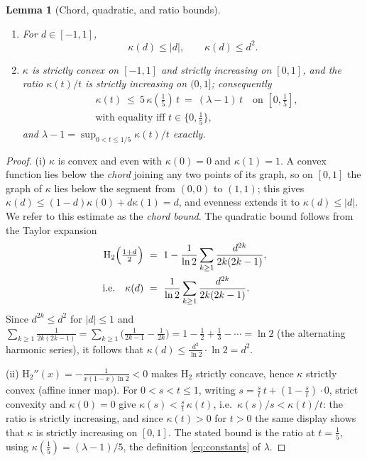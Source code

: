 \documentclass[journal]{IEEEtran}
\newtheorem{lemma}{Lemma}
\theoremstyle{definition}
\newcommand{\Hh}{\mathrm H_2}
\newcommand{\kp}{\kappa}
\newcommand{\lam}{\lambda}
\begin{document}
\begin{lemma}[Chord, quadratic, and ratio bounds]\label{lem:kappa}
\begin{enumerate}
\item[\textup{(i)}] For $d\in[-1,1]$,
\[
  \kp(d)\le|d|,\qquad \kp(d)\le d^2 .
\]
\item[\textup{(ii)}] $\kp$ is strictly convex on $[-1,1]$ and strictly
increasing on $[0,1]$, and the ratio $\kp(t)/t$ is strictly increasing on
$(0,1]$; consequently
\[
\begin{aligned}
  &\kp(t)\ \le\ 5\,\kp(\tfrac15)\,t\ =\ (\lam-1)\,t
  \quad\text{on }[0,\tfrac15],\\
  &\text{with equality iff }t\in\{0,\tfrac15\},
\end{aligned}
\]
and $\lam-1=\sup_{0<t\le1/5}\kp(t)/t$ exactly.
\end{enumerate}
\end{lemma}

\begin{proof}
(i) $\kp$ is convex and even with $\kp(0)=0$ and $\kp(1)=1$. A convex function
lies below the \emph{chord} joining any two points of its graph, so on $[0,1]$
the graph of $\kp$ lies below the segment from $(0,0)$ to $(1,1)$; this gives
$\kp(d)\le(1-d)\kp(0)+d\kp(1)=d$, and evenness extends it to $\kp(d)\le|d|$. We
refer to this estimate as the \emph{chord bound}. The
quadratic bound follows from the Taylor expansion
\[
\begin{aligned}
  \Hh\Bigl(\tfrac{1+d}{2}\Bigr)\ &=\ 1-\frac{1}{\ln2}\sum_{k\ge1}\frac{d^{2k}}{2k(2k-1)},\\
  \text{i.e.}\quad
  \kp(d)\ &=\ \frac{1}{\ln2}\sum_{k\ge1}\frac{d^{2k}}{2k(2k-1)}.
\end{aligned}
\]
Since $d^{2k}\le d^2$ for $|d|\le1$ and
$\sum_{k\ge1}\tfrac1{2k(2k-1)}=\sum_{k\ge1}\bigl(\tfrac1{2k-1}-\tfrac1{2k}\bigr)
=1-\tfrac12+\tfrac13-\cdots=\ln2$ (the alternating harmonic series), it follows
that $\kp(d)\le\tfrac{d^2}{\ln2}\cdot\ln2=d^2$.

(ii) $\Hh''(x)=-\tfrac1{x(1-x)\ln2}<0$ makes $\Hh$ strictly concave, hence
$\kp$ strictly convex (affine inner map). For $0<s<t\le1$, writing
$s=\tfrac st\,t+(1-\tfrac st)\cdot0$, strict convexity and $\kp(0)=0$ give
$\kp(s)<\tfrac st\,\kp(t)$, i.e.\ $\kp(s)/s<\kp(t)/t$: the ratio is strictly
increasing, and since $\kp(t)>0$ for $t>0$ the same display shows that $\kp$
is strictly increasing on $[0,1]$. The stated bound is the ratio at
$t=\tfrac15$, using $\kp(\tfrac15)=(\lam-1)/5$, the definition
\eqref{eq:constants} of $\lam$.
\end{proof}
\end{document}
